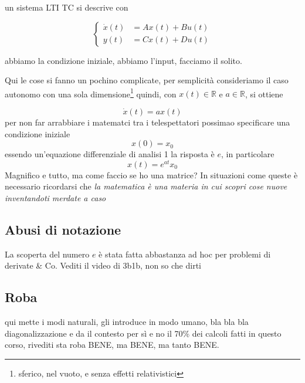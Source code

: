 \documentclass[11pt]{article}
\begin{document}
un sistema LTI TC si descrive con

\begin{equation*}
\begin{cases}
\dot{x}(t) &= Ax(t) + Bu(t) \\
y(t) &= Cx(t) + Du(t)
\end{cases}
\end{equation*}

abbiamo la condizione iniziale, abbiamo l'input, facciamo il solito.

Qui le cose si fanno un pochino complicate, per semplicità
consideriamo il caso autonomo con una sola dimensione\footnote{sferico, nel
vuoto, e senza effetti relativistici}
quindi, con \(x(t) \in \mathbb{R}\) e \(a \in \mathbb{R}\), si ottiene

\[\dot{x}(t) = ax(t) \]
per non far arrabbiare i matematci tra i telespettatori possimao
specificare una condizione iniziale
\[x(0) = x_0 \]
essendo un'equazione differenziale di analisi 1 la risposta è \(e\), in
particolare
\[x(t) = e^{at} x_0\]
Magnifico e tutto, ma come faccio se ho una matrice? In situazioni
come queste è necessario ricordarsi che \emph{la matematica è una materia
in cui scopri cose nuove inventandoti merdate a caso}

\subsection{Abusi di notazione}
\label{sec:org1713a94}
La scoperta del numero \(e\) è stata fatta abbastanza ad hoc per
problemi di derivate \& Co.
Vediti il video di 3b1b, non so che dirti

\subsection{Roba}
\label{sec:org79b9f77}
qui mette i modi naturali, gli introduce in modo umano, bla bla bla
diagonalizzazione e da il contesto per sì e no il 70\% dei calcoli
fatti in questo corso, rivediti sta roba BENE, ma BENE, ma tanto BENE.
\end{document}
